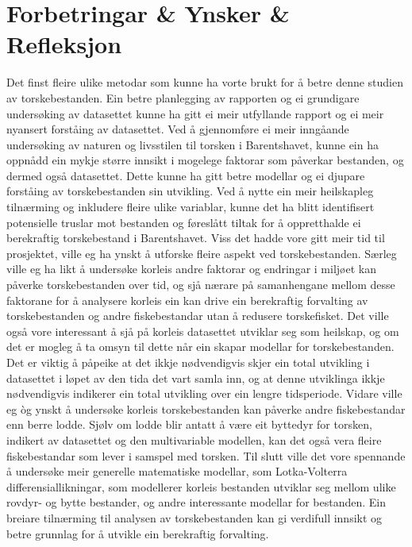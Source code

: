 \documentclass{report}
\begin{document}
\chapter{Forbetringar \& Ynsker \& Refleksjon}
Det finst fleire ulike metodar som kunne ha vorte brukt for å betre denne studien av torskebestanden. Ein betre planlegging av rapporten og ei grundigare undersøking av datasettet kunne ha gitt ei meir utfyllande rapport og ei meir nyansert forståing av datasettet. Ved å gjennomføre ei meir inngåande undersøking av naturen og livsstilen til torsken i Barentshavet, kunne ein ha oppnådd ein mykje større innsikt i mogelege faktorar som påverkar bestanden, og dermed også datasettet. Dette kunne ha gitt betre modellar og ei djupare forståing av torskebestanden sin utvikling.
Ved å nytte ein meir heilskapleg tilnærming og inkludere fleire ulike variablar, kunne det ha blitt identifisert potensielle truslar mot bestanden og føreslått tiltak for å oppretthalde ei berekraftig torskebestand i Barentshavet.
Viss det hadde vore gitt meir tid til prosjektet, ville eg ha ynskt å utforske fleire aspekt ved torskebestanden. Særleg ville eg ha likt å undersøke korleis andre faktorar og endringar i miljøet kan påverke torskebestanden over tid, og sjå nærare på samanhengane mellom desse faktorane for å analysere korleis ein kan drive ein berekraftig forvalting av torskebestanden og andre fiskebestandar utan å redusere torskefisket. Det ville også vore interessant å sjå på korleis datasettet utviklar seg som heilskap, og om det er mogleg å ta omsyn til dette når ein skapar modellar for torskebestanden. Det er viktig å påpeike at det ikkje nødvendigvis skjer ein total utvikling i datasettet i løpet av den tida det vart samla inn, og at denne utviklinga ikkje nødvendigvis indikerer ein total utvikling over ein lengre tidsperiode.
Vidare ville eg òg ynskt å undersøke korleis torskebestanden kan påverke andre fiskebestandar enn berre lodde. Sjølv om lodde blir antatt å være eit byttedyr for torsken, indikert av datasettet og den multivariable modellen, kan det også vera fleire fiskebestandar som lever i samspel med torsken. Til slutt ville det vore spennande å undersøke meir generelle matematiske modellar, som Lotka-Volterra differensiallikningar, som modellerer korleis bestanden utviklar seg mellom ulike rovdyr- og bytte bestander, og andre interessante modellar for bestanden. Ein breiare tilnærming til analysen av torskebestanden kan gi verdifull innsikt og betre grunnlag for å utvikle ein berekraftig forvalting.
\end{document}
